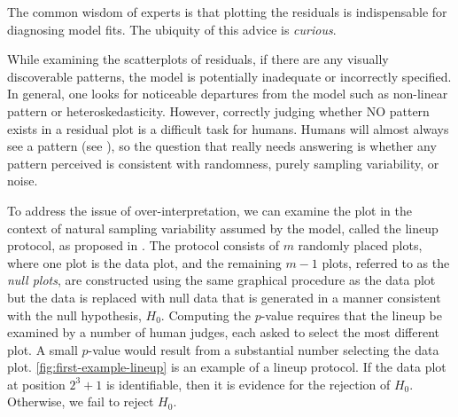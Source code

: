 \documentclass{vgtc}                          %
\begin{document}
\noindent The common wisdom of experts is that plotting the residuals is
indispensable for diagnosing model fits. The ubiquity of this advice is
\emph{curious}.

While examining the scatterplots of residuals, if there are any visually 
discoverable patterns, the model is potentially inadequate or incorrectly 
specified. In general,
one looks for noticeable departures from the model such as non-linear
pattern or heteroskedasticity. However, correctly 
judging whether NO pattern exists in a residual plot is a
difficult task for humans. Humans will almost always see a pattern (see
\cite{kahneman2011thinking}), so the question that really needs
answering is whether any pattern perceived is consistent with
randomness, purely sampling variability, or noise. 

To address the issue of over-interpretation, we can examine the plot in
the context of natural sampling variability assumed by the model, called
the lineup protocol, as proposed in \cite{buja2009statistical}. 
The protocol consists of \(m\) randomly placed plots, where one plot is the
data plot, and the remaining \(m - 1\) plots, referred to as the
\emph{null plots}, are constructed using the same graphical procedure as
the data plot but the data is replaced with null data that is generated
in a manner consistent with the null hypothesis, \(H_0\). Computing the 
\(p\)-value requires that the 
lineup be examined by a number of human judges, 
each asked to select the most different plot. 
A small $p$-value would result from a substantial number 
selecting the data plot.
\autoref{fig:first-example-lineup} is an example of a lineup
protocol. If the data plot at position \(2^3 + 1\) is identifiable, then
it is evidence for the rejection of \(H_0\). Otherwise, 
we fail to reject \(H_0\). 
\end{document}
